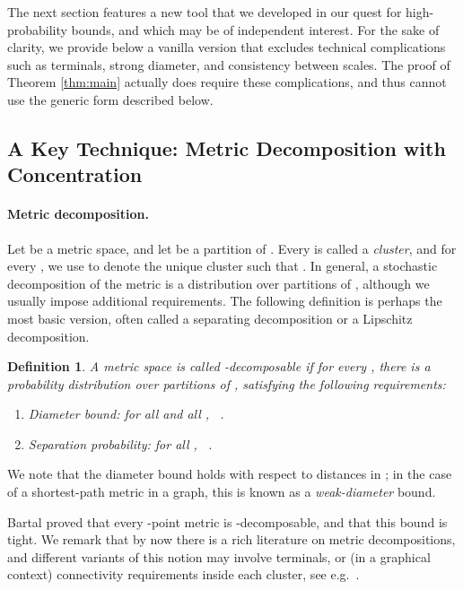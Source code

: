 \documentclass[twoside,leqno,twocolumn]{article}
\newtheorem{definition}[Definition]{Definition}
\newtheorem{definition}[theorem]{Definition}
\def\compactify{\itemsep=0pt \topsep=0pt \partopsep=0pt \parsep=0pt}
\begin{document}
The next section features a new tool that we developed in our quest 
for high-probability bounds, and which may be of independent interest.
For the sake of clarity, we provide below  
a vanilla version that excludes technical complications 
such as terminals, strong diameter, and consistency between scales.
The proof of Theorem \ref{thm:main} actually does require these complications, 
and thus cannot use the generic form described below.


\subsection{A Key Technique: Metric Decomposition with Concentration} \label{sec:techniques}

\paragraph{Metric decomposition.}

Let  be a metric space, and let  be a partition of .
Every  is called a {\em cluster},
and for every , we use  to denote the unique cluster 
 such that .
In general, a stochastic decomposition of the metric  
is a distribution  over partitions of ,
although we usually impose additional requirements.
The following definition is perhaps the most basic version,
often called a separating decomposition or a Lipschitz decomposition.

\begin{definition}\label{def:beta}
A metric space  is called {\em -decomposable} 
if for every , there is a probability distribution  over 
partitions of , satisfying the following requirements:
\begin{enumerate} \compactify
\renewcommand{\theenumi}{\emph{(\alph{enumi})}}
\item \label{it:DiameterBound}
Diameter bound: for all  and all , 
  \ . 
\item \label{it:SeparatingProb}
Separation probability: for all ,
  \ .
\end{enumerate}
\end{definition}
We note that the diameter bound holds with respect to distances in ;
in the case of a shortest-path metric in a graph, 
this is known as a {\em weak-diameter} bound.

Bartal \cite{Bartal96} proved that every -point metric is 
-decomposable, and that this bound is tight. 
We remark that by now there is a rich literature on metric decompositions,
and different variants of this notion may involve terminals,
or (in a graphical context) connectivity requirements inside each cluster,
see e.g.\ \cite{LS93,Bartal96, CKR01, FRT04, Bartal04, LN05, GNR10, EGKRTT10, MN07, AGMW10, KR11}.
\end{document}
